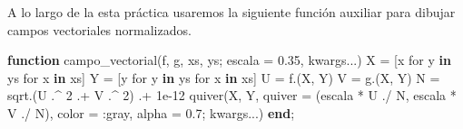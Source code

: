 \documentclass[
  spanish,
  a4paper,
]{scrreport}
\newenvironment{Shaded}{\begin{snugshade}}{\end{snugshade}}
\newcommand{\FloatTok}[1]{\textcolor[rgb]{0.68,0.00,0.00}{#1}}
\newcommand{\FunctionTok}[1]{\textcolor[rgb]{0.28,0.35,0.67}{#1}}
\newcommand{\KeywordTok}[1]{\textcolor[rgb]{0.00,0.23,0.31}{\textbf{#1}}}
\newcommand{\NormalTok}[1]{\textcolor[rgb]{0.00,0.23,0.31}{#1}}
\newcommand{\OperatorTok}[1]{\textcolor[rgb]{0.37,0.37,0.37}{#1}}
\theoremstyle{definition}
\theoremstyle{remark}
\begin{document}
A lo largo de la esta práctica usaremos la siguiente función auxiliar
para dibujar campos vectoriales normalizados.

\begin{Shaded}
\begin{Highlighting}[]
\KeywordTok{function} \FunctionTok{campo\_vectorial}\NormalTok{(f, g, xs, ys; escala }\OperatorTok{=} \FloatTok{0.35}\NormalTok{, kwargs}\OperatorTok{...}\NormalTok{)}
\NormalTok{    X }\OperatorTok{=}\NormalTok{ [x for y }\KeywordTok{in}\NormalTok{ ys for x }\KeywordTok{in}\NormalTok{ xs]}
\NormalTok{    Y }\OperatorTok{=}\NormalTok{ [y for y }\KeywordTok{in}\NormalTok{ ys for x }\KeywordTok{in}\NormalTok{ xs]}
\NormalTok{    U }\OperatorTok{=} \FunctionTok{f}\NormalTok{.(X, Y)}
\NormalTok{    V }\OperatorTok{=} \FunctionTok{g}\NormalTok{.(X, Y)}
\NormalTok{    N }\OperatorTok{=} \FunctionTok{sqrt}\NormalTok{.(U }\OperatorTok{.\^{}} \FloatTok{2} \OperatorTok{.+}\NormalTok{ V }\OperatorTok{.\^{}} \FloatTok{2}\NormalTok{) }\OperatorTok{.+} \FloatTok{1e{-}12}
    \FunctionTok{quiver}\NormalTok{(X, Y, quiver }\OperatorTok{=}\NormalTok{ (escala }\OperatorTok{*}\NormalTok{ U }\OperatorTok{./}\NormalTok{ N, escala }\OperatorTok{*}\NormalTok{ V }\OperatorTok{./}\NormalTok{ N),}
\NormalTok{           color }\OperatorTok{=} \OperatorTok{:}\NormalTok{gray, alpha }\OperatorTok{=} \FloatTok{0.7}\NormalTok{; kwargs}\OperatorTok{...}\NormalTok{)}
\KeywordTok{end}\NormalTok{;}
\end{Highlighting}
\end{Shaded}
\end{document}
